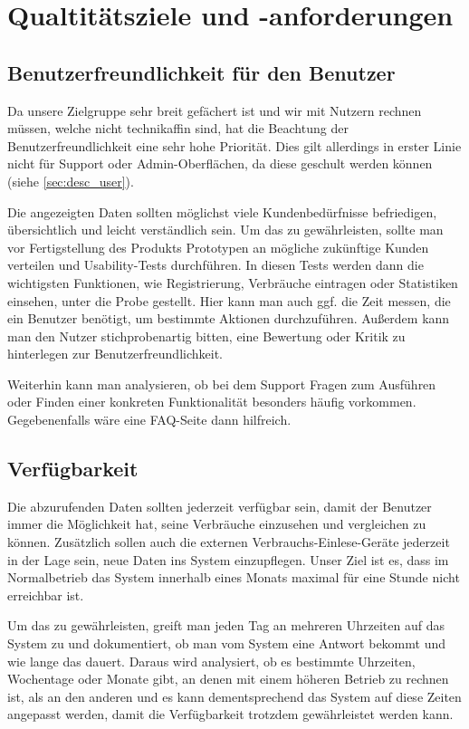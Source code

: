 \section{Qualtitätsziele und -anforderungen}
\label{quality_requirements}

\subsection{Benutzerfreundlichkeit für den Benutzer}
Da unsere Zielgruppe sehr breit gefächert ist und wir mit Nutzern rechnen müssen, welche nicht technikaffin sind,
hat die Beachtung der Benutzerfreundlichkeit eine sehr hohe Priorität.
Dies gilt allerdings in erster Linie nicht für Support oder Admin-Oberflächen, da diese geschult werden können (siehe \ref{sec:desc_user}).

Die angezeigten Daten sollten möglichst viele Kundenbedürfnisse
befriedigen, übersichtlich und leicht verständlich sein.
Um das zu gewährleisten, sollte man vor Fertigstellung des Produkts Prototypen an mögliche zukünftige Kunden verteilen
und Usability-Tests durchführen.
In diesen Tests werden dann die wichtigsten Funktionen, wie Registrierung, Verbräuche eintragen oder Statistiken einsehen,
unter die Probe gestellt.
Hier kann man auch ggf. die Zeit messen, die ein Benutzer benötigt, um bestimmte Aktionen durchzuführen.
Außerdem kann man den Nutzer stichprobenartig bitten, eine Bewertung oder Kritik zu hinterlegen zur Benutzerfreundlichkeit.

Weiterhin kann man analysieren, ob bei dem Support Fragen zum Ausführen oder Finden einer konkreten Funktionalität
besonders häufig vorkommen.
Gegebenenfalls wäre eine FAQ-Seite dann hilfreich.

\subsection{Verfügbarkeit}
Die abzurufenden Daten sollten jederzeit verfügbar sein,
damit der Benutzer immer die Möglichkeit hat,
seine Verbräuche einzusehen und vergleichen zu können.
Zusätzlich sollen auch die externen Verbrauchs-Einlese-Geräte jederzeit in der Lage sein, neue Daten ins System
einzupflegen.
Unser Ziel ist es, dass im Normalbetrieb das System innerhalb eines Monats maximal für eine Stunde nicht erreichbar ist.

Um das zu gewährleisten, greift man jeden Tag an mehreren Uhrzeiten auf das System zu
und dokumentiert, ob man vom System eine Antwort bekommt und wie lange das dauert.
Daraus wird analysiert, ob es bestimmte Uhrzeiten, Wochentage oder Monate gibt,
an denen mit einem höheren Betrieb zu rechnen ist, als an den anderen und es kann dementsprechend das
System auf diese Zeiten angepasst werden, damit die Verfügbarkeit trotzdem gewährleistet werden kann.

